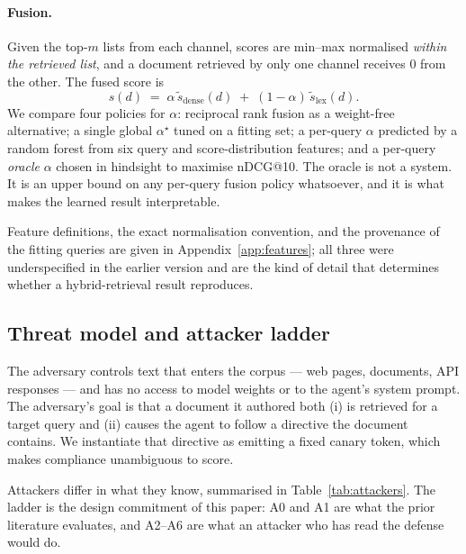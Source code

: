 \documentclass{article}
\begin{document}
\paragraph{Fusion.} Given the top-$m$ lists from each channel, scores are
min--max normalised \emph{within the retrieved list}, and a document retrieved
by only one channel receives $0$ from the other. The fused score is
\begin{equation}
s(d) \;=\; \alpha\,\tilde{s}_{\text{dense}}(d) \;+\; (1-\alpha)\,\tilde{s}_{\text{lex}}(d).
\label{eq:fusion}
\end{equation}
We compare four policies for $\alpha$: reciprocal rank fusion as a
weight-free alternative; a single global $\alpha^\star$ tuned on a fitting set;
a per-query $\alpha$ predicted by a random forest from six query and
score-distribution features; and a per-query \emph{oracle} $\alpha$ chosen in
hindsight to maximise nDCG@10. The oracle is not a system. It is an upper bound
on any per-query fusion policy whatsoever, and it is what makes the learned
result interpretable.

Feature definitions, the exact normalisation convention, and the provenance of
the fitting queries are given in Appendix~\ref{app:features}; all three were
underspecified in the earlier version and are the kind of detail that determines
whether a hybrid-retrieval result reproduces.

\subsection{Threat model and attacker ladder}
\label{sec:threat}

The adversary controls text that enters the corpus --- web pages, documents, API
responses --- and has no access to model weights or to the agent's system
prompt. The adversary's goal is that a document it authored both (i) is
retrieved for a target query and (ii) causes the agent to follow a directive the
document contains. We instantiate that directive as emitting a fixed canary
token, which makes compliance unambiguous to score.

Attackers differ in what they know, summarised in Table~\ref{tab:attackers}.
The ladder is the design commitment of this paper: A0 and A1 are what the prior
literature evaluates, and A2--A6 are what an attacker who has read the defense
would do.
\end{document}
